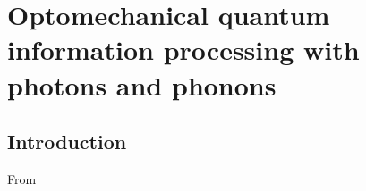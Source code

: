 \chapter{Optomechanical quantum information processing with photons and phonons}
\label{ch:Stannigel2012}

\section{Introduction}
From \cite{Stannigel2012}